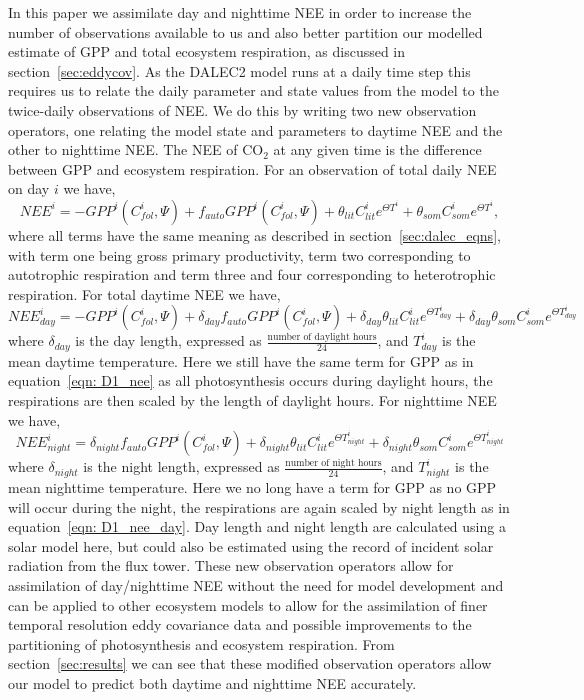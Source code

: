 \documentclass[11pt]{article}
\begin{document}
In this paper we assimilate day and nighttime NEE in order to increase the number of observations available to us and also better partition our modelled estimate of GPP and total ecosystem respiration, as discussed in section~\ref{sec:eddycov}. As the DALEC2 model runs at a daily time step this requires us to relate the daily parameter and state values from the model to the twice-daily observations of NEE. We do this by writing two new observation operators, one relating the model state and parameters to daytime NEE and the other to nighttime NEE. The NEE of CO\(_{2}\) at any given time is the difference between GPP and ecosystem respiration. For an observation of total daily NEE on day \(i\) we have,
\begin{equation}
NEE^{i}=-GPP^{i}(C_{fol}^{i}, \Psi) +f_{auto}GPP^{i}(C_{fol}^{i}, \Psi) + \theta_{lit}C_{lit}^i e^{\Theta T^{i}} + \theta_{som}C_{som}^i e^{\Theta T^{i}}, \label{eqn: D1_nee}
\end{equation}
where all terms have the same meaning as described in section~\ref{sec:dalec_eqns}, with term one being gross primary productivity, term two corresponding to autotrophic respiration and term three and four corresponding to heterotrophic respiration. For total daytime NEE we have,
\begin{equation}
NEE_{day}^{i} = -GPP^{i}(C_{fol}^{i}, \Psi) + \delta_{day}f_{auto}GPP^{i}(C_{fol}^{i}, \Psi) + \delta_{day}\theta_{lit}C_{lit}^i e^{\Theta T_{day}^{i}} + \delta_{day}\theta_{som}C_{som}^i e^{\Theta T_{day}^{i}} \label{eqn: D1_nee_day}
\end{equation}
where \(\delta_{day}\) is the day length, expressed as \(\frac{\text{number of daylight hours}}{24}\), and \(T_{day}^{i}\) is the mean daytime temperature. Here we still have the same term for GPP as in equation~\eqref{eqn: D1_nee} as all photosynthesis occurs during daylight hours, the respirations are then scaled by the length of daylight hours. For nighttime NEE we have,
\begin{equation}
NEE_{night}^{i} =  \delta_{night}f_{auto}GPP^{i}(C_{fol}^{i}, \Psi) + \delta_{night}\theta_{lit}C_{lit}^i e^{\Theta T_{night}^{i}} + \delta_{night}\theta_{som}C_{som}^i e^{\Theta T_{night}^{i}} \label{eqn: D1_nee_night}
\end{equation}
where \(\delta_{night}\) is the night length, expressed as \(\frac{\text{number of night hours}}{24}\), and \(T_{night}^{i}\) is the mean nighttime temperature. Here we no long have a term for GPP as no GPP will occur during the night, the respirations are again scaled by night length as in equation~\eqref{eqn: D1_nee_day}. Day length and night length are calculated using a solar model here, but could also be estimated using the record of incident solar radiation from the flux tower. These new observation operators allow for assimilation of day/nighttime NEE without the need for model development and can be applied to other ecosystem models to allow for the assimilation of finer temporal resolution eddy covariance data and possible improvements to the partitioning of photosynthesis and ecosystem respiration. From section~\ref{sec:results} we can see that these modified observation operators allow our model to predict both daytime and nighttime NEE accurately.
\end{document}
